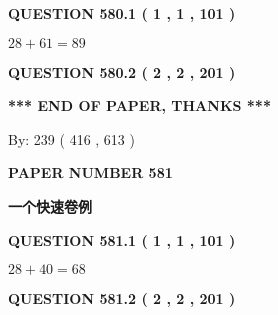 \documentclass{ctexart}
\begin{document}
{\textbf{\Large{QUESTION
580.1 
 ( 1 , 1 , 101 )
}}}
  
  
 
 

$ %
28 +  %
61=   %
89$
 
 
  
\vspace{0.2in}
  
{\textbf{\Large{QUESTION
580.2 
 ( 2 , 2 , 201 )
}}}
  
  
   
   
 \vspace{0.2in}
 
   
   
   
   
\vspace{1.0in} 
{\textbf{\large{ *** END OF PAPER, THANKS *** }}} 
   
   
\hspace{1.0in} By: 
 239 ( 416 ,  613 )
   
   
   
   
\newpage 
\setcounter{page}{ 
   581001 } 
   
   
   
   
 {\textbf{ \Large{ PAPER NUMBER  581  }}}
   
   
\vspace{0.2in}
   
   
   
   
   
   
 \vspace{0.2in}
{\LARGE {\textbf{ 一个快速卷例}}}
   
   
  
\vspace{0.2in}
  
{\textbf{\Large{QUESTION
581.1 
 ( 1 , 1 , 101 )
}}}
  
  
 
 

$ %
28 +  %
40=   %
68$
 
 
  
\vspace{0.2in}
  
{\textbf{\Large{QUESTION
581.2 
 ( 2 , 2 , 201 )
}}}
  
  
   
   
 \vspace{0.2in}
 
   
   
\end{document}
